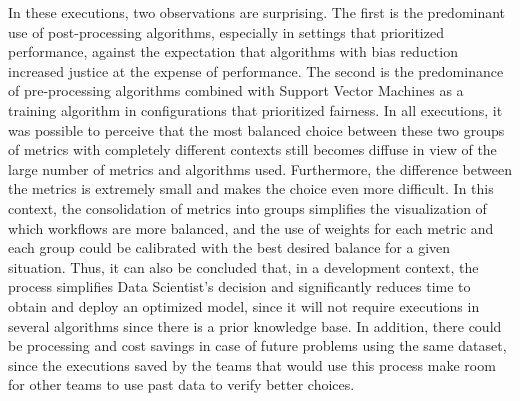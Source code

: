 \documentclass[sigconf]{acmart}
\begin{document}
In these executions, two observations are surprising. The first is the predominant use of post-processing algorithms, especially in settings that prioritized performance, against the expectation that algorithms with bias reduction increased justice at the expense of performance. The second is the predominance of pre-processing algorithms combined with Support Vector Machines as a training algorithm in configurations that prioritized fairness.
In all executions, it was possible to perceive that the most balanced choice between these two groups of metrics with completely different contexts still becomes diffuse in view of the large number of metrics and algorithms used. Furthermore, the difference between the metrics is extremely small and makes the choice even more difficult. In this context, the consolidation of metrics into groups simplifies the visualization of which workflows are more balanced, and the use of weights for each metric and each group could be calibrated with the best desired balance for a given situation. Thus, it can also be concluded that, in a development context, the process simplifies Data Scientist's decision and significantly reduces time to obtain and deploy an optimized model, since it will not require executions in several algorithms since there is a prior knowledge base. In addition, there could be processing and cost savings in case of future problems using the same dataset, since the executions saved by the teams that would use this process make room for other teams to use past data to verify better choices.

\begin{table}[H]
\begin{center}
  \caption{Top options chosen by Autonomic Manager \\ 50\% Performance/50\% Fairness}
\label{tbl:ScoreMAPEKOverall5050}
\end{center}
\end{table}
\end{document}
